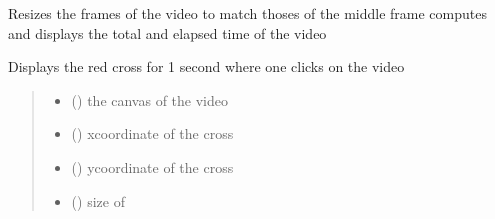 \documentclass[letterpaper,10pt,english]{sphinxmanual}
\begin{document}
\begin{fulllineitems}
\begin{fulllineitems}
\sphinxAtStartPar
Resizes the frames of the video to match thoses  of the middle frame
computes and displays the total and elapsed time of the video

\end{fulllineitems}


\begin{fulllineitems}
\label{\detokenize{general_interface:general_interface_V10.LecteurVideo.ajouter_plus_rouge}}
\pysigstartsignatures
{}
\pysigstopsignatures
\sphinxAtStartPar
Displays the red cross for 1 second where one clicks on the video
\begin{quote}\begin{description}
\begin{itemize}
\item {} 
\sphinxAtStartPar
{} () \textendash{} the canvas of the video

\item {} 
\sphinxAtStartPar
{} () \textendash{} x\sphinxhyphen{}coordinate of the cross

\item {} 
\sphinxAtStartPar
{} () \textendash{} y\sphinxhyphen{}coordinate of the cross

\item {} 
\sphinxAtStartPar
{} () \textendash{} size of 

\end{itemize}

\end{description}\end{quote}

\end{fulllineitems}


\end{fulllineitems}
\end{document}
